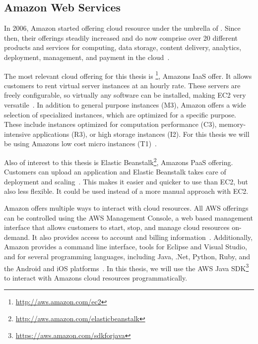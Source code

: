 \subsection{Amazon Web Services}

In 2006, Amazon started offering cloud resource under the umbrella of .
Since then, their offerings steadily increased and do now comprise over 20 different products and services for computing, data storage, content delivery, analytics, deployment, management, and payment in the cloud~\autocite{aws:about}.

The most relevant cloud offering for this thesis is \footnote{\url{http://aws.amazon.com/ec2}}, Amazons IaaS offer.
It allows customers to rent virtual server instances at an hourly rate.
These servers are freely configurable, so virtually any software can be installed, making EC2 very versatile~\autocite{aws:ec2}.
In addition to general purpose instances (M3), Amazon offers a wide selection of specialized instances, which are optimized for a specific purpose.
These include instances optimized for computation performance (C3), memory-intensive applications (R3), or high storage instances (I2).
For this thesis we will be using Amazons low cost micro instances (T1)~\autocite{aws:instances}.

Also of interest to this thesis is Elastic Beanstalk\footnote{\url{http://aws.amazon.com/elasticbeanstalk}}, Amazons PaaS offering.
Customers can upload an application and Elastic Beanstalk takes care of deployment and scaling~\autocite{aws:beanstalk}.
This makes it easier and quicker to use than EC2, but also less flexible.
It could be used instead of a more manual approach with EC2.

Amazon offers multiple ways to interact with cloud resources.
All AWS offerings can be controlled using the AWS Management Console, a web based management interface that allows customers to start, stop, and manage cloud resources on-demand.
It also provides access to account and billing information~\autocite{aws:managementconsole}.
Additionally, Amazon provides a command line interface, tools for Eclipse and Visual Studio, and  for several programming languages, including Java, .Net, Python, Ruby, and the Android and iOS platforms~\autocite{aws:tools}.
In this thesis, we will use the AWS Java SDK\footnote{\url{https://aws.amazon.com/sdkforjava}} to interact with Amazons cloud resources programmatically.
